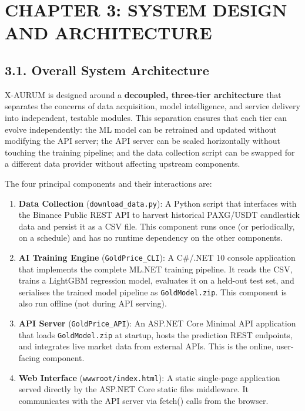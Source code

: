 \section{CHAPTER 3: SYSTEM DESIGN AND ARCHITECTURE}

\subsection{3.1. Overall System Architecture}

X-AURUM is designed around a \textbf{decoupled, three-tier architecture} that separates the concerns of data acquisition, model intelligence, and service delivery into independent, testable modules. This separation ensures that each tier can evolve independently: the ML model can be retrained and updated without modifying the API server; the API server can be scaled horizontally without touching the training pipeline; and the data collection script can be swapped for a different data provider without affecting upstream components.

The four principal components and their interactions are:

\begin{enumerate}
  \item \textbf{Data Collection} (\texttt{download\_data.py}): A Python script that interfaces with the Binance Public REST API to harvest historical PAXG/USDT candlestick data and persist it as a CSV file. This component runs once (or periodically, on a schedule) and has no runtime dependency on the other components.

  \item \textbf{AI Training Engine} (\texttt{GoldPrice\_CLI}): A C\#/.NET 10 console application that implements the complete ML.NET training pipeline. It reads the CSV, trains a LightGBM regression model, evaluates it on a held-out test set, and serialises the trained model pipeline as \texttt{GoldModel.zip}. This component is also run offline (not during API serving).

  \item \textbf{API Server} (\texttt{GoldPrice\_API}): An ASP.NET Core Minimal API application that loads \texttt{GoldModel.zip} at startup, hosts the prediction REST endpoints, and integrates live market data from external APIs. This is the online, user-facing component.

  \item \textbf{Web Interface} (\texttt{wwwroot/index.html}): A static single-page application served directly by the ASP.NET Core static files middleware. It communicates with the API server via fetch() calls from the browser.
\end{enumerate}

